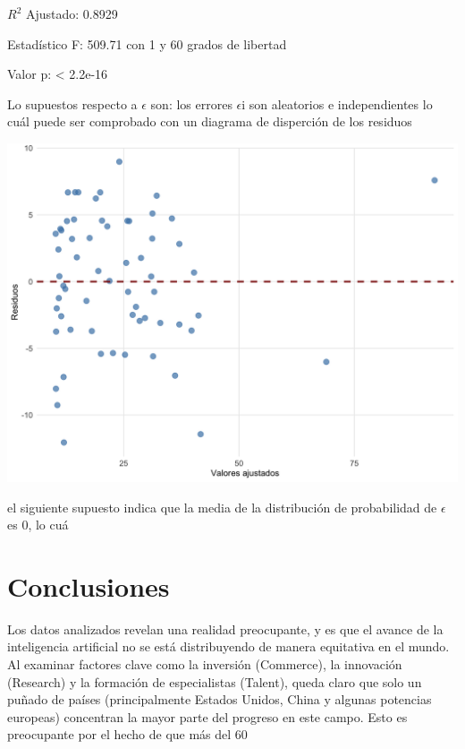 \documentclass[
]{article}
\begin{document}
\begin{multicols}{2}
$R^2$ Ajustado:  0.8929 

Estadístico F:  509.71  con  1  y  60  grados de libertad

Valor p:  < 2.2e-16 

Lo supuestos respecto a $\epsilon$ son: los errores $\epsilon$i son aleatorios e independientes lo cuál puede ser comprobado con un diagrama de disperción de los residuos


\begin{center}
\includegraphics[width=\linewidth]{figura12.png}
\end{center}

el siguiente supuesto indica que la media de la distribución de probabilidad de $\epsilon$ es 0, lo cuá

\section{Conclusiones}

Los datos analizados revelan una realidad preocupante, y es que el avance de la inteligencia artificial no se está distribuyendo de manera equitativa en el mundo. Al examinar factores clave como la inversión (Commerce), la innovación (Research) y la formación de especialistas (Talent), queda claro que solo un puñado de países (principalmente Estados Unidos, China y algunas potencias europeas) concentran la mayor parte del progreso en este campo. Esto es preocupante por el hecho de que más del 60%


\end{multicols}
\end{document}
